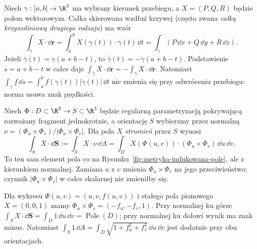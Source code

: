 \begin{przyklad}
\label{prz:calka-skierowana-krzywa}
Niech $\gamma:[a,b]\to\R^3$ ma wybrany kierunek
przebiegu, a $X=(P,Q,R)$ będzie polem wektorowym.
Całka skierowana wzdłuż
krzywej (często zwana \emph{całką krzywoliniową
drugiego rodzaju}) ma wzór
\begin{equation}\label{eq:calka-skierowana-krzywa}
 \int_\gamma X\cdot\dd\mathbf r
 =\int_a^b X(\gamma(t))\cdot\dot\gamma(t)\,\dd t
 =\int_\gamma(P\,\dd x+Q\,\dd y+R\,\dd z).
\end{equation}
Jeżeli $\bar\gamma(t)=\gamma(a+b-t)$, to
$\dot{\bar\gamma}(t)=-\dot\gamma(a+b-t)$.
Podstawienie $s=a+b-t$ w całce daje
$\int_{\bar\gamma}X\cdot\dd\mathbf r
=-\int_\gamma X\cdot\dd\mathbf r$.
Natomiast $\int_\gamma f\,\dd s
=\int_a^b f(\gamma(t))|\dot\gamma(t)|\,\dd t$
nie zmienia się przy odwróceniu przebiegu:
norma usuwa znak prędkości.
\end{przyklad}

\begin{przyklad}
\label{prz:calka-skierowana-powierzchnia}
Niech $\Phi:D\subset\R^2\to S\subset\R^3$
będzie regularną parametryzacją pokrywającą rozważany
fragment jednokrotnie, a orientację
$S$ wybierzmy przez normalną
$\nu=(\Phi_u\times\Phi_v)/|\Phi_u\times\Phi_v|$.
Dla pola $X$ \emph{strumień} przez $S$ wynosi
\begin{equation}\label{eq:calka-skierowana-powierzchnia}
 \int_S X\cdot\dd\mathbf S
 :=\int_S X\cdot\nu\,\dd A
 =\int_D X(\Phi(u,v))\cdot
           (\Phi_u\times\Phi_v)\,\dd u\,\dd v.
\end{equation}
To ten sam element pola co na
Rysunku~\ref{fig:metryka-indukowana-pole},
ale z kierunkiem normalnej.
Zamiana $u$ z $v$ zmienia
$\Phi_u\times\Phi_v$ na jego przeciwieństwo;
czynnik $|\Phi_u\times\Phi_v|$ w całce skalarnej
nie zmieniłby się.

Dla wykresu $\Phi(u,v)=(u,v,f(u,v))$
i stałego pola pionowego $X=(0,0,1)$ mamy
$\Phi_u\times\Phi_v=(-f_u,-f_v,1)$.
Przy normalnej ku górze
$\int_S X\cdot\dd\mathbf S=\int_D1\,\dd u\,\dd v
=\operatorname{Pole}(D)$; przy normalnej ku dołowi
wynik ma znak minus. Natomiast
$\int_S1\,\dd A
=\int_D\sqrt{1+f_u^2+f_v^2}\,\dd u\,\dd v$
jest dodatnie przy obu orientacjach.
\end{przyklad}

